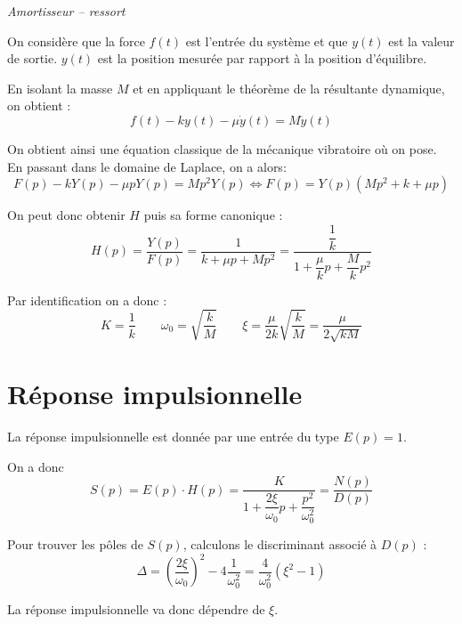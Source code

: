 \documentclass[10pt,fleqn]{article} %
\begin{document}
\begin{exemple}

\textit{Amortisseur -- ressort}

\ifprof
On considère que la force $f(t)$ est l'entrée du système et que $y(t)$ est la
valeur de sortie. $y(t)$ est la position mesurée par rapport à la position
d'équilibre. 

En isolant la masse $M$ et en appliquant le théorème de la résultante
dynamique, on obtient : 
$$
f(t)-ky(t)-\mu\dot{y}(t) = M\ddot{y}(t) 
$$

On obtient ainsi une équation classique de la mécanique vibratoire où on pose. En passant dans le domaine de Laplace, on a alors: 
$$
F(p)-kY(p)-\mu p Y(p) = Mp^2Y(p) 
\Longleftrightarrow
F(p)= Y(p) \left( Mp^2 + k + \mu p \right)
$$

On peut donc obtenir $H$ puis sa forme canonique :
$$
H(p)=\dfrac{Y(p)}{F(p)} 
= \dfrac{1}{k + \mu p + Mp^2}
= \dfrac{\dfrac{1}{k}}{1 + \dfrac{\mu}{k} p + \dfrac{M}{k}p^2}
$$

Par identification on a donc :
$$K=\dfrac{1}{k} \quad \quad 
\omega_0=\sqrt{\dfrac{k}{M}}\quad  \quad 
\xi=\dfrac{\mu}{2k} \sqrt{\dfrac{k}{M}}
=\dfrac{\mu}{2\sqrt{kM}}
$$

\else
{}
\fi

\end{exemple}


\section{Réponse impulsionnelle}
La réponse impulsionnelle est donnée par une entrée du type $E(p)=1$.

On a donc 
$$
S(p)=E(p)\cdot H(p) = \dfrac{K}{1+ \dfrac{2\xi}{\omega_0}p+\dfrac{p^2}{\omega_0^2}}
=\dfrac{N(p)}{D(p)}
$$

Pour trouver les pôles de $S(p)$, calculons le discriminant associé à $D(p)$ :
$$
\Delta  = \left( \dfrac{2\xi}{\omega_0}\right)^2-4\dfrac{1}{\omega_0^2}
=\dfrac{4}{\omega_0^2}\left( \xi^2 -1\right)
$$

La réponse impulsionnelle va donc dépendre de $\xi$.
\end{document}
